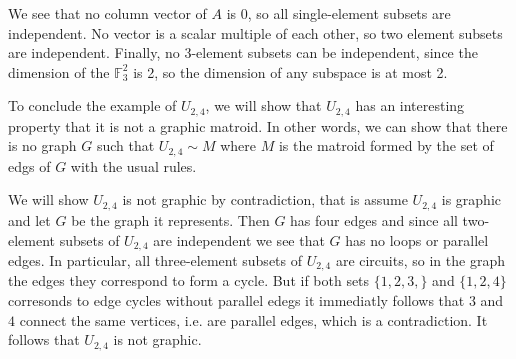  We see that no column vector of $A$ is 0, so all single-element subsets are independent. No vector is a scalar multiple of each other, so two element subsets are independent. Finally, no 3-element subsets can be independent, since the dimension of the $\mathbb{F}_3^2$ is 2, so the dimension of any subspace is at most 2.

To conclude the example of $U_{2,4}$, we will show that $U_{2,4}$ has an interesting property that it is not a graphic matroid. In other words, we can show that there is no graph $G$ such that $U_{2,4} \sim M$ where $M$ is the matroid formed by the set of edgs of $G$ with the usual rules. 

We will show $U_{2,4}$ is not graphic by contradiction, that is assume $U_{2,4}$ is graphic and let $G$ be the graph it represents. Then $G$ has four edges and since all two-element subsets of $U_{2,4}$ are independent we see that $G$ has no loops or parallel edges. In particular, all three-element subsets of $U_{2,4}$ are circuits, so in the graph the edges they correspond to form a cycle. But if both sets $\{1,2,3,\}$ and $\{1,2,4\}$ corresonds to edge cycles without parallel edegs it immediatly follows that $3$ and $4$ connect the same vertices, i.e. are parallel edges, which is a contradiction. It follows that $U_{2,4}$ is not graphic.


